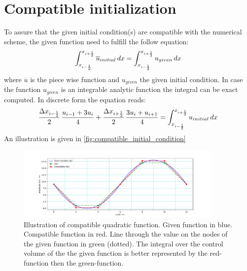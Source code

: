 \section{Compatible initialization}
To assure that the given initial condition(s) are compatible with the numerical scheme, the given function need to fulfill the follow equation:
\begin{align}
    \int_{x_{i-\frac{1}{2}}}^{x_{i+\frac{1}{2}}} \overline u_{initial}\, dx = \int_{x_{i-\frac{1}{2}}}^{x_{i+\frac{1}{2}}} u_{given}\, dx
\end{align}
where $\overline{u}$ is the piece wise function and $u_{given}$ the given initial condition.
In case the function $u_{given}$ is an integrable analytic function the integral can be exact computed.
In discrete form the equation reads:
\begin{align}
    \frac{\Delta x_{i-\frac{1}{2}}}{2}\,\frac{u_{i-1} + 3 u_i}{4} +
    \frac{\Delta x_{i+\frac{1}{2}}}{2}\,\frac{3 u_i + u_{i+1}}{4} = \int_{x_{i-\frac{1}{2}}}^{x_{i+\frac{1}{2}}} u_{initial}\, dx
\end{align}
An illustration is given in \autoref{fig:compatible_initial_condition}
\begin{figure}[H]
    \centering
    \includegraphics[width=0.9\textwidth]{figures/compatible_initialization_lx=12.0_dx=2.0.pdf}
    \caption{Illustration of compatible quadratic function. Given function in blue. Compatible function in red. Line through the value on the nodes of the given function in green (dotted). The integral over the control volume of the the given function is better represented by the red-function then the green-function. }\label{fig:compatible_initial_condition}
\end{figure}